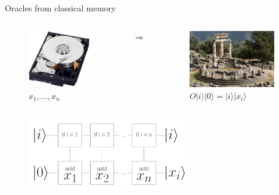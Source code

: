 \documentclass[
  ignorenonframetext,
]{beamer}
\begin{document}
\begin{frame}{Oracles from classical memory}
\protect\hypertarget{oracles-from-classical-memory}{}
\begin{columns}[T]
\begin{column}{.4\textwidth}

\begin{figure}
\centering
\includegraphics[height=2.5cm]{hard_drive.jpg}
\caption{$x_1, ..., x_n$}
\end{figure}

\end{column}
\begin{column}{.1\textwidth}
\pause
\begin{center}
\vspace{1.5cm}
$\Rightarrow$
\end{center}
\end{column}

\begin{column}{.4\textwidth}
\begin{figure}
\centering
\includegraphics[height=2.5cm]{oracle.jpg}
\caption{$O \lvert i \rangle \lvert 0 \rangle = \lvert i \rangle \lvert x_i \rangle$}
\end{figure}
\end{column}

\end{columns}

\pause

\begin{figure}
\centering
\includegraphics[height=3.2cm]{RAM.png}
\end{figure}
\end{frame}
\end{document}

